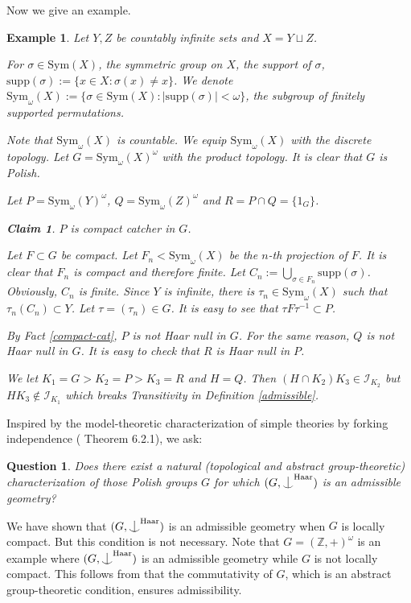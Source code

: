\documentclass{article}
\newtheorem{example}[definition]{Example}
\newtheorem{ques}[definition]{Question}
\newtheorem*{claim}{Claim}
\newenvironment{claimproof}[1][\proofname]
               {
                 \proof[#1]
                 \renewcommand*\qedsymbol{$\square$\rlap{\textsubscript{Claim}}}
               }
               {
                 \endproof
               }
\newcommand{\Z}{\mathbb{Z}}
\newcommand{\I}{\mathcal{I}}
\newcommand{\HH}{\mathrm{Haar}}
\newcommand{\Sym}{\mathrm{Sym}}
\newcommand{\supp}{\mathrm{supp}}
\newcommand{\ind}{\mathrel{\raise0.2ex\hbox{\ooalign{\hidewidth$\vert$\hidewidth\cr\raise-0.9ex\hbox{$\smile$}}}}}
\begin{document}
Now we give an example.

\begin{example}
Let $Y,Z$ be countably infinite sets and $X=Y\sqcup Z$.

For $\sigma\in \Sym(X)$, the symmetric group
on $X$, the support of $\sigma$, $\supp(\sigma):=\{x\in X:\sigma(x)\neq x\}$. We denote $\Sym_\omega(X):=\{\sigma\in \Sym(X):|\supp(\sigma)|<\omega\}$, the subgroup of finitely supported permutations. 

Note that $\Sym_\omega(X)$ is countable.
We equip $\Sym_\omega(X)$ with the discrete topology. Let $G=\Sym_\omega(X)^\omega$ with the product topology. It is clear that $G$ is Polish.

Let $P=\Sym_\omega(Y)^\omega$, $Q=\Sym_\omega(Z)^\omega$ and $R=P\cap Q=\{1_G\}$. 

\begin{claim}
$P$ is compact catcher in $G$.
\end{claim}
\begin{claimproof}
Let $F\subset G$ be compact. Let $F_n<\Sym_\omega(X)$ be the $n$-th projection of $F$. It is clear that $F_n$ is compact and therefore finite. Let $C_n:=\bigcup_{\sigma\in F_n}\supp(\sigma)$. Obviously, $C_n$ is finite. 
Since $Y$ is infinite, there is $\tau_n\in \Sym_\omega(X)$ such that $\tau_n(C_n)\subset Y$. Let $\tau=(\tau_n)\in G$. It is easy to see that $\tau F \tau^{-1}\subset P$.
\end{claimproof}

By Fact \ref{compact-cat}, $P$ is not Haar null in $G$. For the same reason, $Q$ is not Haar null in $G$.  
It is easy to check that $R$ is Haar null in $P$.

We let $K_1=G>K_2=P>K_3=R$ and $H=Q$. Then $(H\cap K_2)K_3\in \I_{K_2}$ but $HK_3\notin \I_{K_1}$ which breaks Transitivity in Definition \ref{admissible}.
\end{example}

Inspired by the model-theoretic characterization of simple theories by forking independence (\cite{Simple} Theorem 6.2.1), we ask:

\begin{ques}
Does there exist a natural (topological and abstract group-theoretic) characterization of those Polish groups $G$ for which $(G, \ind^\HH)$ is an admissible geometry?
\end{ques}

We have shown that $(G,\ind^\HH)$ is an admissible geometry when $G$ is locally compact. But this condition is not necessary. Note that $G=(\Z,+)^\omega$ is an example where $(G,\ind^\HH)$ is an admissible geometry while $G$ is not locally compact. This follows from that the commutativity of $G$, which is an abstract group-theoretic condition, ensures admissibility.
\end{document}
